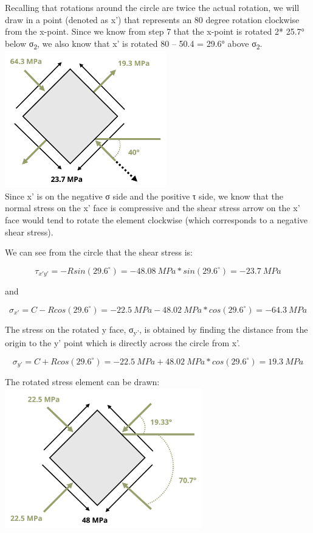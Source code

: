 \documentclass[
  letterpaper,
  DIV=11,
  numbers=noendperiod]{scrreprt}
\theoremstyle{definition}
\theoremstyle{remark}
\begin{document}
\begin{tcolorbox}
\begin{tcolorbox}
\begin{enumerate}
  Recalling that rotations around the circle are twice the actual
  rotation, we will draw in a point (denoted as x') that represents an
  80 degree rotation clockwise from the x-point. Since we know from step
  7 that the x-point is rotated 2* 25.7° below σ\textsubscript{2}, we
  also know that x' is rotated 80 -- 50.4 = 29.6° above
  σ\textsubscript{2}.\\
  \includegraphics[width=2.76042in,height=\textheight]{images/CH12 figures/example 12.4 part 7.png}\\
  Since x' is on the negative σ side and the positive τ side, we know
  that the normal stress on the x' face is compressive and the shear
  stress arrow on the x' face would tend to rotate the element clockwise
  (which corresponds to a negative shear stress).

  We can see from the circle that the shear stress is:

  \[
  \tau_{x'y'}=-Rsin(29.6^\circ)=-48.08{~MPa}*sin(29.6^\circ)=-23.7{~MPa}
  \]

  and

  \[
  \sigma_{x'}=C-Rcos(29.6^\circ)=-22.5{~MPa}-48.02{~MPa}*cos(29.6^\circ)=-64.3{~MPa}
  \]

  The stress on the rotated y face, σ\textsubscript{y'}, is obtained by
  finding the distance from the origin to the y' point which is directly
  across the circle from x'.

  \[
  \sigma_{y'}=C+Rcos(29.6^\circ)=-22.5{~MPa}+48.02{~MPa}*cos(29.6^\circ)=19.3{~MPa}
  \]

  The rotated stress element can be drawn:\\
  \includegraphics[width=3.36458in,height=\textheight]{images/CH12 figures/example 12.4 part 8.png}
\end{enumerate}


\end{tcolorbox}
\end{tcolorbox}
\end{document}
